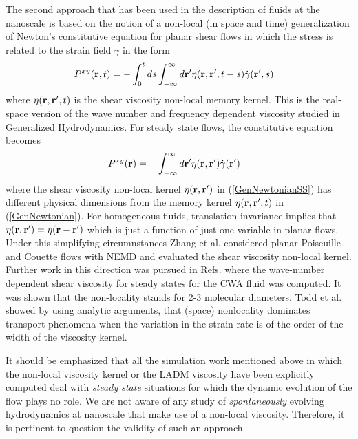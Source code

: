 \documentclass[a4paper,openright,12pt]{book}
\begin{document}
The second approach that has been used in the description of fluids at
the nanoscale  is based  on the  notion of a  non-local (in  space and
time)  generalization of  Newton's  constitutive  equation for  planar
shear  flows in  which  the  stress is  related  to  the strain  field
$\dot{\gamma}$ in the form \cite{EvansMorris2008}
\begin{align}
  P^{xy}({\bf r},t)&=-\int_0^t ds \int_{-\infty}^{\infty} d{\bf r}'
\eta({\bf r},{\bf r}',t-s)\dot{\gamma}({\bf r}',s)
\label{GenNewtonian}
\end{align}
where  $\eta({\bf r},{\bf  r}',t)$  is the  shear viscosity  non-local
memory kernel.  This is the real-space  version of the wave number and
frequency     dependent    viscosity     studied    in     Generalized
Hydrodynamics.  For  steady  state flows,  the  constitutive  equation
becomes
\begin{align}
  P^{xy}({\bf r})&=-\int_{-\infty}^{\infty} d{\bf r}'
\eta({\bf r},{\bf r}')\dot{\gamma}({\bf r}')
\label{GenNewtonianSS}
\end{align}
where the shear viscosity non-local kernel $\eta({\bf r},{\bf r}')$ in
(\ref{GenNewtonianSS})  has  different  physical dimensions  from  the
memory kernel $\eta({\bf r},{\bf r}',t)$ in (\ref{GenNewtonian}).  For
homogeneous  fluids, translation  invariance  implies that  $\eta({\bf
  r},{\bf r}')=\eta({\bf  r}-{\bf r}')$  which is  just a  function of
just   one  variable   in  planar   flows.   Under   this  simplifying
circumnstances  Zhang  et   al.   \cite{Zhang2004}  considered  planar
Poiseuille  and  Couette  flows  with NEMD  and  evaluated  the  shear
viscosity  non-local kernel.  Further  work in
this        direction        was        pursued        in        Refs.
\cite{Hansen2007,Todd2008a,Cadusch2008}    where    the    wave-number
dependent  shear viscosity  for steady  states for  the CWA  fluid was
computed. It was shown that  the non-locality stands for 2-3 molecular
diameters.   Todd et  al.   \cite{Todd2008} showed  by using  analytic
arguments, that (space) nonlocality dominates transport phenomena when
the variation in the  strain rate is of the order of  the width of the
viscosity kernel.

It should be  emphasized that all the simulation  work mentioned above
in which  the non-local  viscosity kernel or  the LADM  viscosity have
been explicitly  computed deal  with \textit{steady  state} situations
for which the dynamic evolution of the  flow plays no role. We are not
aware of any study of \textit{spontaneously} evolving hydrodynamics at
nanoscale that  make use  of a non-local  viscosity. Therefore,  it is
pertinent to question the validity of such an approach.
\end{document}
